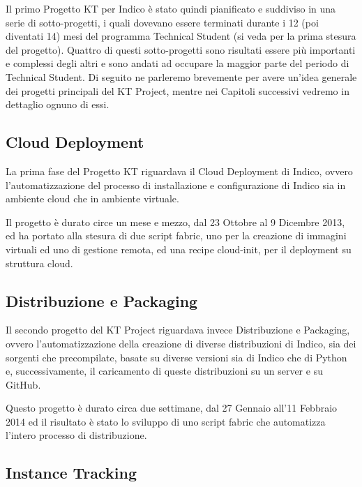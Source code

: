     	Il primo Progetto KT per Indico è stato quindi pianificato e suddiviso in una serie di sotto-progetti, i quali dovevano essere terminati durante i 12 (poi diventati 14) mesi del programma Technical Student (si veda \cite{pedro:gist} per la prima stesura del progetto). Quattro di questi sotto-progetti sono risultati essere più importanti e complessi degli altri e sono andati ad occupare la maggior parte del periodo di Technical Student. Di seguito ne parleremo brevemente per avere un'idea generale dei progetti principali del KT Project, mentre nei Capitoli successivi vedremo in dettaglio ognuno di essi.
    	
    	\subsection{Cloud Deployment} \label{subsec:p;pp;cloud}
    	
        	La prima fase del Progetto KT riguardava il Cloud Deployment di Indico, ovvero l'automatizzazione del processo di installazione e configurazione di Indico sia in ambiente cloud che in ambiente virtuale.
        	
        	Il progetto è durato circe un mese e mezzo, dal 23 Ottobre al 9 Dicembre 2013, ed ha portato alla stesura di due script fabric, uno per la creazione di immagini virtuali ed uno di gestione remota, ed una recipe cloud-init, per il deployment su struttura cloud.
    	
    	\subsection{Distribuzione e Packaging} \label{subsec:p;pp:distribuzione}
    	
        	Il secondo progetto del KT Project riguardava invece Distribuzione e Packaging, ovvero l'automatizzazione della creazione di diverse distribuzioni di Indico, sia dei sorgenti che precompilate, basate su diverse versioni sia di Indico che di Python e, successivamente, il caricamento di queste distribuzioni su un server e su GitHub.
        	
        	Questo progetto è durato circa due settimane, dal 27 Gennaio all'11 Febbraio 2014 ed il risultato è stato lo sviluppo di uno script fabric che automatizza l'intero processo di distribuzione.
    	
    	\subsection{Instance Tracking} \label{subsec:p;pp;instance_tracker}
    	
